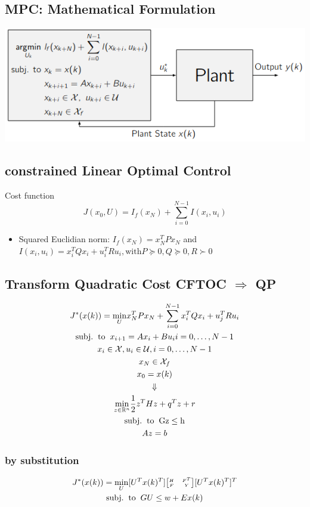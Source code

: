 \subsection{MPC: Mathematical Formulation}
\includegraphics[width = \linewidth]{MPC_summary/Images/Screenshot from 2021-07-30 16-13-03.png}
\subsection{constrained Linear Optimal Control}
Cost function \[J(x_0,U) = I_f(x_N)+\sum^{N-1}_{i=0} I (x_i,u_i)\]
\begin{itemize}
    \item Squared  Euclidian norm: $I_f(x_N)=x_N^TPx_N$ and $I(x_i,u_i ) = x_i^TQx_i+u^T_iRu_i, \mathrm{with} P \succeq 0, Q\succeq 0, R\succ 0$
\end{itemize}
\subsection{Transform Quadratic Cost CFTOC $\Rightarrow$ QP}
\begin{gather*}
    J^*(x(k)) = \underset{U}{\mathrm{min}}x^T_NPx_N+ \sum^{N-1}_{i=0}x_i^TQx_i + u_j^TRu_i \\ 
    \mathrm{subj. \hspace{2mm} to \hspace{2mm}} x_{i+1}= Ax_{i} + Bu_{i} i = 0,\dots,N-1 \\
    x_{i} \in \mathcal{X}, u_i \in \mathcal{U}, i= 0,\dots,N-1 \\
    {x_{N} \in \mathcal{X}_f}\\
    x_{0} = x(k)\\
    \Downarrow\\
    \underset{z\in\mathbb{R}^n}{\mathrm{min}}\frac{1}{2}z^THz +q^Tz +r\\
    \mathrm{subj. \hspace{2mm} to\hspace{2mm} Gz\leq h}\\
    Az = b
\end{gather*}
\subsubsection{by substitution}
\begin{gather*}
    J^*(x(k)) = \underset{U}{\mathrm{min}} [U^Tx(k)^T]
    \tiny{\begin{bmatrix}
    H & F^T\\
    F & Y
    \end{bmatrix}} [U^Tx (k)^T ]^T\\ 
    \mathrm{subj.\hspace{2mm} to\hspace{2mm}} GU \leq w + E x(k)
\end{gather*}
